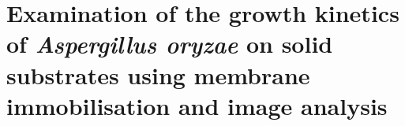 \documentclass[a4paper,12pt]{report}
\begin{document}
\setcounter{chapter}{3}

\chapter{Examination of the growth kinetics of \emph{Aspergillus oryzae} on solid substrates using membrane immobilisation and image analysis}\label{ch:KinSolidSub}









\newpage
{}
{}



\end{document}
